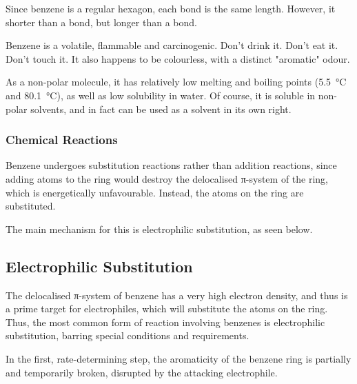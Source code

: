 		Since benzene is a regular hexagon, each  bond is the same length. However, it shorter than a  bond, but longer
		than a  bond.

		Benzene is a volatile, flammable and carcinogenic. Don't drink it. Don't eat it. Don't touch it. It also happens to be colourless,
		with a distinct "aromatic" odour.

		As a non-polar molecule, it has relatively low melting and boiling points (\SI{5.5}{\celsius} and \SI{80.1}{\celsius}), as well as low
		solubility in water. Of course, it is soluble in non-polar solvents, and in fact can be used as a solvent in its own right.



	\subsubsection{Chemical Reactions}

		Benzene undergoes substitution reactions rather than addition reactions, since adding atoms to the ring would destroy the
		delocalised π-system of the ring, which is energetically unfavourable. Instead, the  atoms on the ring are substituted.

		The main mechanism for this is electrophilic substitution, as seen below.




\pagebreak
\subsection{Electrophilic Substitution}

	The delocalised π-system of benzene has a very high electron density, and thus is a prime target for electrophiles, which
	will substitute the  atoms on the ring. Thus, the most common form of reaction involving benzenes is electrophilic
	substitution, barring special conditions and requirements.


	\vspace{1.0em}

	In the first, rate-determining step, the aromaticity of the benzene ring is partially and temporarily broken, disrupted by
	the attacking electrophile.




